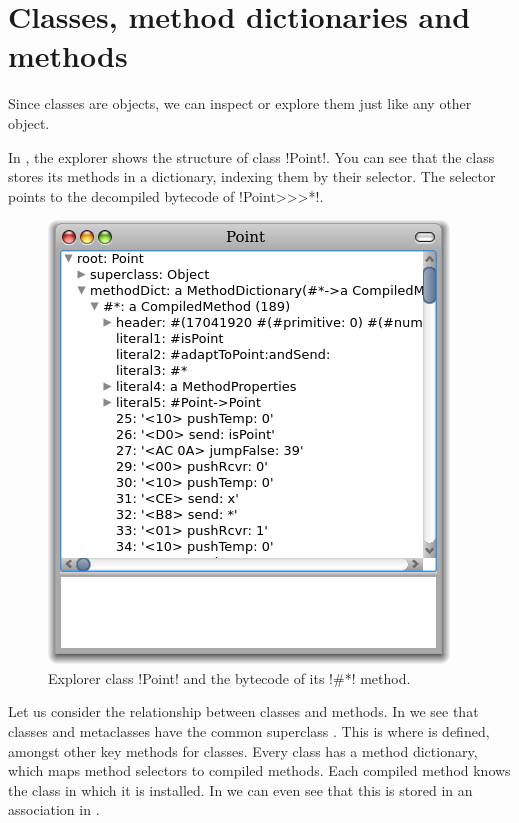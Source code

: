 \documentclass[a4paper,10pt,twoside]{book}
\begin{document}
\section{Classes, method dictionaries and methods}

Since classes are objects, we can inspect or explore them just like any other object.


In , the explorer shows the structure of class \ct!Point!.
You can see that the class stores its methods in a dictionary, indexing them by their selector.
The selector \ct{#*} points to the decompiled bytecode of \ct!Point>>>*!.

\begin{figure}[ht]\centering
	\includegraphics[width=.5\linewidth]{CompiledMethod}
	\caption{Explorer class \ct!Point! and the bytecode of its \ct!\#*! method.\label{fig:CompiledMethod}}
\end{figure}


Let us consider the relationship between classes and methods.
In  we see that classes and metaclasses have the common superclass . This is where  is defined, amongst other key methods for classes.
Every class has a method dictionary, which maps method selectors to compiled methods.
Each compiled method knows the class in which it is installed.
In  we can even see that this is stored in an association in .
\end{document}
